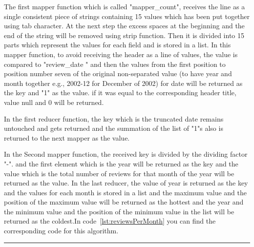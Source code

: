 The first mapper function which is called "mapper\_count", receives the line as a single consistent piece of strings containing 15 values which has been put together using tab character. At the next step the excess spaces at the beginning and the end of the string will be removed using strip function. Then it is divided into 15 parts which represent the values for each field and is stored in a list. In this mapper function, to avoid receiving the header as a line of values, the value is compared to "review\_date " and then the values from the first position to position number seven of the original non-separated value (to have year and month together e.g., 2002-12 for December of 2002) for date will be returned as the key and "1" as the value. if it was equal to the corresponding header title, value null and 0 will be returned.

In the first reducer function, the key which is the truncated date remains untouched and gets returned and the summation of the list of "1"s also is returned to the next mapper as the value.

In the Second mapper function, the received key is divided by the dividing factor "-". and the first element which is the year will be returned as the key and the value which is the total number of reviews for that month of the year will be returned as the value. In the last reducer, the value of year is returned as the key and the values for each month is stored in a list and the maximum value and the position of the maximum value will be returned as the hottest and the year and the minimum value and the position of the minimum value in the list will be returned as the coldest.In code~\ref{lst:reviewsPerMonth} you can find the corresponding code for this algorithm.

\rule{200 pt}{0.5 pt} 

